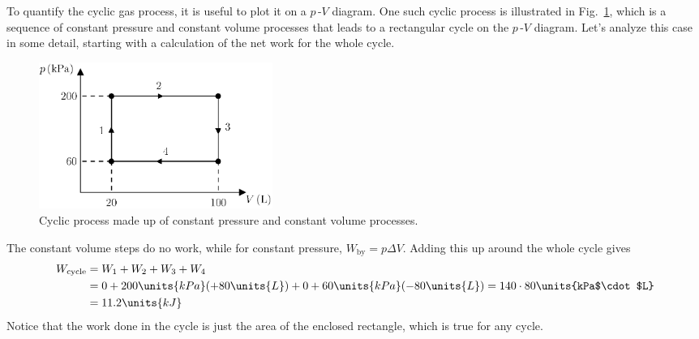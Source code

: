 To quantify the cyclic gas process, it is useful to plot it on a
$p$\,-$V$ diagram.  One such cyclic process is illustrated in
Fig.~\ref{fig:rectangle_cycle}, which is a sequence of constant
pressure and constant volume processes that leads to a rectangular
cycle on the $p$\,-$V$ diagram.  Let's analyze this case in some detail,
starting with a calculation of the net work for the whole cycle.

\begin{figure}
\begin{center}
\includegraphics[width=3in]{heat_engines/rectangle.eps}
\caption{Cyclic process made up of constant pressure and constant volume
processes.}
\label{fig:rectangle_cycle}
\end{center}
\end{figure}

The constant volume steps do no work, while for constant pressure,
$W_\text{by}=p\Delta V$.  Adding this up around the whole cycle gives
\begin{align}
W_\text{cycle} &= W_1 +  W_2 + W_3 + W_4 \nonumber\\
 &= 0 + 200 \units{kPa}(+80\units{L}) + 0 +
 60\units{kPa}(-80\units{L})  = 140\cdot 80 \units{kPa$\cdot$L}\nonumber\\
&= 11.2\units{kJ}
\label{eq:work_for_rectangle}
\end{align}
Notice that the work done in the cycle is just the area of the enclosed
rectangle, which is true for any cycle.

